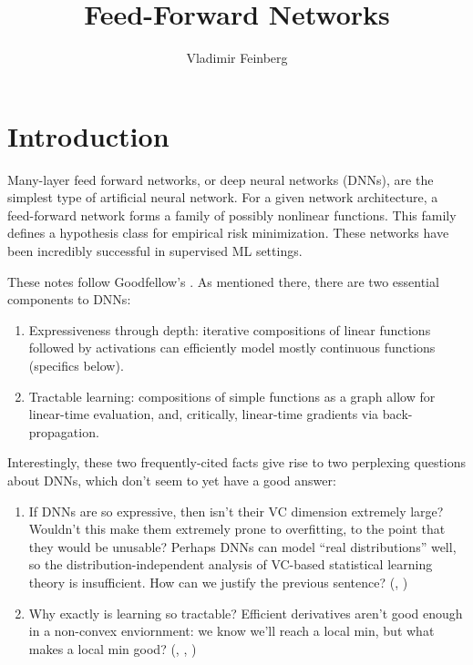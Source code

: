 \documentclass{article}
\title{Feed-Forward Networks}
\author{Vladimir Feinberg}
\begin{document}
\maketitle

\section{Introduction}

Many-layer feed forward networks, or deep neural networks (DNNs), are the simplest type of artificial neural network. For a given network architecture, a feed-forward network forms a family of possibly nonlinear functions. This family defines a hypothesis class for empirical risk minimization. These networks have been incredibly successful in supervised ML settings.

These notes follow Goodfellow's . As mentioned there, there are two essential components to DNNs:
\begin{enumerate}
\item Expressiveness through depth: iterative compositions of linear functions followed by activations can efficiently model mostly continuous functions (specifics below).
\item Tractable learning: compositions of simple functions as a graph allow for linear-time evaluation, and, critically, linear-time gradients via back-propagation.
\end{enumerate}

Interestingly, these two frequently-cited facts give rise to two perplexing questions about DNNs, which don't seem to yet have a good answer:
\begin{enumerate}
\item If DNNs are so expressive, then isn't their VC dimension extremely large? Wouldn't this make them extremely prone to overfitting, to the point that they would be unusable? Perhaps DNNs can model ``real distributions'' well, so the distribution-independent analysis of VC-based statistical learning theory is insufficient. How can we justify the previous sentence? (, )
\item Why exactly is learning so tractable? Efficient derivatives aren't good enough in a non-convex enviornment: we know we'll reach a local min, but what makes a local min good? (, , )
\end{enumerate}
\end{document}
